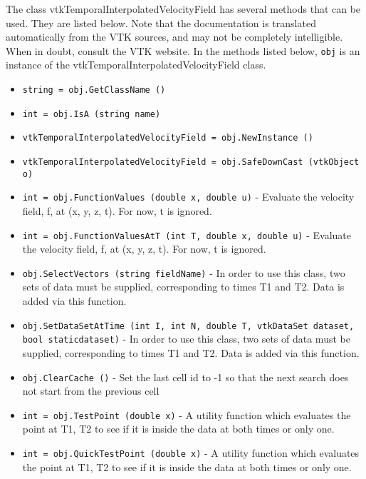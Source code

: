 The class vtkTemporalInterpolatedVelocityField has several methods that can be used.
  They are listed below.
Note that the documentation is translated automatically from the VTK sources,
and may not be completely intelligible.  When in doubt, consult the VTK website.
In the methods listed below, \verb|obj| is an instance of the vtkTemporalInterpolatedVelocityField class.
\begin{itemize}
\item  \verb|string = obj.GetClassName ()|

\item  \verb|int = obj.IsA (string name)|

\item  \verb|vtkTemporalInterpolatedVelocityField = obj.NewInstance ()|

\item  \verb|vtkTemporalInterpolatedVelocityField = obj.SafeDownCast (vtkObject o)|

\item  \verb|int = obj.FunctionValues (double x, double u)| -  Evaluate the velocity field, f, at (x, y, z, t).
 For now, t is ignored.

\item  \verb|int = obj.FunctionValuesAtT (int T, double x, double u)| -  Evaluate the velocity field, f, at (x, y, z, t).
 For now, t is ignored.

\item  \verb|obj.SelectVectors (string fieldName)| -  In order to use this class, two sets of data must be supplied, 
 corresponding to times T1 and T2. Data is added via
 this function.

\item  \verb|obj.SetDataSetAtTime (int I, int N, double T, vtkDataSet dataset, bool staticdataset)| -  In order to use this class, two sets of data must be supplied, 
 corresponding to times T1 and T2. Data is added via
 this function.

\item  \verb|obj.ClearCache ()| -  Set the last cell id to -1 so that the next search does not
 start from the previous cell

\item  \verb|int = obj.TestPoint (double x)| -  A utility function which evaluates the point at T1, T2 to see 
 if it is inside the data at both times or only one.

\item  \verb|int = obj.QuickTestPoint (double x)| -  A utility function which evaluates the point at T1, T2 to see 
 if it is inside the data at both times or only one.


\end{itemize}
